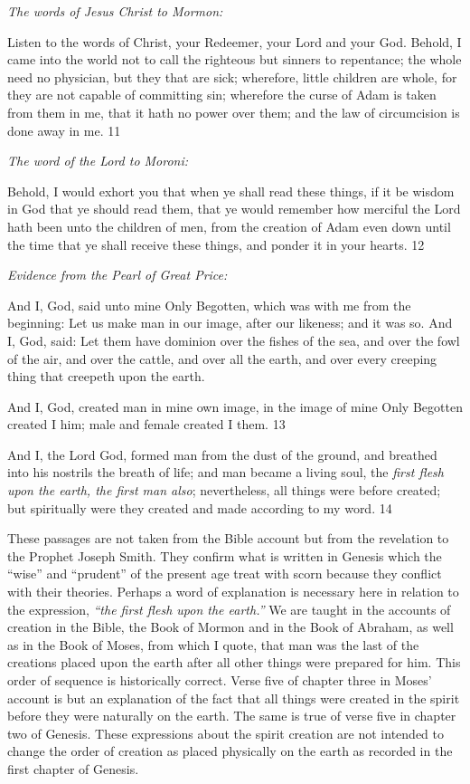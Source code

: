 \textit{The words of Jesus Christ to Mormon:}

Listen to the words of Christ, your Redeemer, your Lord and your God. Behold, I came into
the world not to call the righteous but sinners to repentance; the whole need no physician, but
they that are sick; wherefore, little children are whole, for they are not capable of committing
sin; wherefore the curse of Adam is taken from them in me, that it hath no power over them;
and the law of circumcision is done away in me. 11

\textit{The word of the Lord to Moroni:}

Behold, I would exhort you that when ye shall read these things, if it be wisdom in God that
ye should read them, that ye would remember how merciful the Lord hath been unto the
children of men, from the creation of Adam even down until the time that ye shall receive
these things, and ponder it in your hearts. 12

\textit{Evidence from the Pearl of Great Price:}

And I, God, said unto mine Only Begotten, which was with me from the beginning: Let us
make man in our image, after our likeness; and it was so. And I, God, said: Let them have
dominion over the fishes of the sea, and over the fowl of the air, and over the cattle, and over
all the earth, and over every creeping thing that creepeth upon the earth.

And I, God, created man in mine own image, in the image of mine Only Begotten created I
him; male and female created I them. 13

And I, the Lord God, formed man from the dust of the ground, and breathed into his nostrils
the breath of life; and man became a living soul, the \textit{first flesh upon the earth, the first man
also}; nevertheless, all things were before created; but spiritually were they created and made
according to my word. 14

These passages are not taken from the Bible account but from the revelation to the Prophet
Joseph Smith. They confirm what is written in Genesis which the ``wise'' and ``prudent'' of the
present age treat with scorn because they conflict with their theories. Perhaps a word of
explanation is necessary here in relation to the expression, \textit{``the first flesh upon the earth.''}
We are taught in the accounts of creation in the Bible, the Book of Mormon and in the Book
of Abraham, as well as in the Book of Moses, from which I quote, that man was the last of
the creations placed upon the earth after all other things were prepared for him. This order of
sequence is historically correct. Verse five of chapter three in Moses' account is but an
explanation of the fact that all things were created in the spirit before they were naturally on
the earth. The same is true of verse five in chapter two of Genesis. These expressions about
the spirit creation are not intended to change the order of creation as placed physically on the
earth as recorded in the first chapter of Genesis.

